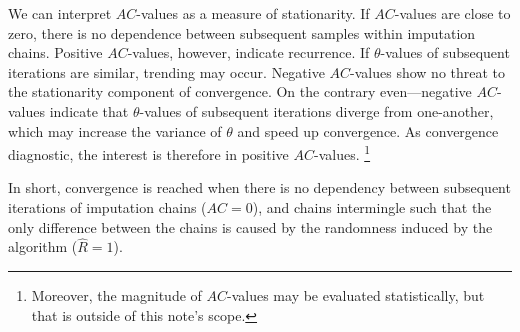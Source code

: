 \documentclass[article]{jss}
\begin{document}
We can interpret %
$AC$-values as a measure of stationarity. If $AC$-values are close to zero, there is no dependence between subsequent samples within imputation chains. Positive $AC$-values, however, indicate recurrence. If $\theta$-values of subsequent iterations are similar, trending may occur. Negative $AC$-values show no threat to the stationarity component of convergence. %
On the contrary even---negative $AC$-values indicate that $\theta$-values of subsequent iterations diverge from one-another, which may increase the variance of $\theta$ and speed up convergence.  %
As convergence diagnostic, the interest is therefore in positive $AC$-values.%
\footnote{Moreover, the magnitude of $AC$-values may be evaluated statistically, but that is outside of this note's scope.}

In short, convergence is reached when there is no dependency between subsequent iterations of imputation chains ($AC = 0$), and chains intermingle such that the only difference between the chains is caused by the randomness induced by the algorithm ($\widehat{R} = 1$).

\end{document}

